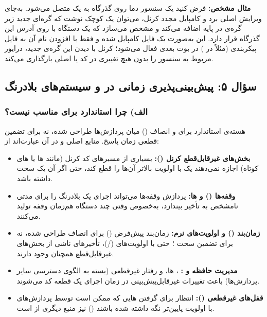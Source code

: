 \textbf{مثال مشخص:} فرض کنید یک سنسور دما روی گذرگاه  به یک  متصل می‌شود. به‌جای ویرایش  اصلی برد و کامپایل مجدد کرنل، می‌توان یک  کوچک نوشت که گره‌ای جدید زیر گره‌ی  در  پایه اضافه می‌کند و مشخص می‌سازد که یک دستگاه با  روی آدرس  این گذرگاه قرار دارد. این  به‌صورت یک فایل  کامپایل شده و فقط با افزودن نام آن به فایل پیکربندی  (مثلاً  در ) در بوت بعدی فعال می‌شود؛ کرنل با دیدن این گره‌ی جدید، درایور مربوط به سنسور  را بدون هیچ تغییری در کد یا  اصلی بارگذاری می‌کند.

\subsection{سؤال ۵: پیش‌بینی‌پذیری زمانی در  و سیستم‌های بلادرنگ}

\subsubsection*{الف) چرا  استاندارد برای  مناسب نیست؟}

هسته‌ی  استاندارد برای  و انصاف () میان پردازش‌ها طراحی شده، نه برای تضمین قطعی زمان پاسخ. منابع اصلی  و  در آن عبارت‌اند از:
\begin{itemize}
	\item \textbf{بخش‌های غیرقابل‌قطع کرنل ():} بسیاری از مسیرهای کد کرنل (مانند ها یا های کوتاه) اجازه نمی‌دهند یک  با اولویت بالاتر آن‌ها را قطع کند، حتی اگر آن  یک  سخت داشته باشد.
	\item \textbf{وقفه‌ها () و ها:} پردازش وقفه‌ها می‌تواند اجرای یک  بلادرنگ را برای مدتی نامشخص به تأخیر بیندازد، به‌خصوص وقتی چند دستگاه هم‌زمان وقفه تولید می‌کنند.
	\item \textbf{زمان‌بند () و اولویت‌های نرم:} زمان‌بند پیش‌فرض  () برای انصاف طراحی شده، نه برای تضمین سخت ؛ حتی با اولویت‌های  (/)، تأخیرهای ناشی از بخش‌های غیرقابل‌قطع همچنان وجود دارند.
	\item \textbf{مدیریت حافظه و :} ، ها، و رفتار غیرقطعی  (بسته به الگوی دسترسی سایر پردازش‌ها) باعث تغییرات غیرقابل‌پیش‌بینی در زمان اجرای یک قطعه کد می‌شوند.
	\item \textbf{قفل‌های غیرقطعی ():} انتظار برای گرفتن هایی که ممکن است توسط پردازش‌های با اولویت پایین‌تر نگه داشته شده باشند () نیز منبع دیگری از  است.
\end{itemize}

